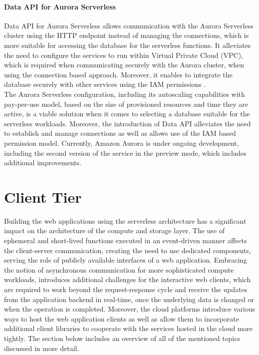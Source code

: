 \paragraph{Data API for Aurora Serverless}

Data API for Aurora Serverless allows communication with the Aurora Serverless cluster using the HTTP endpoint instead of managing the connections, which is more suitable for accessing the database for the serverless functions.
It alleviates the need to configure the services to run within Virtual Private Cloud (VPC), which is required when communicating securely with the Aurora cluster, when using the connection based approach.
Moreover, it enables to integrate the database securely with other services using the IAM permissions \cite{AuroraServerlessDataAPI}. \\

The Aurora Serverless configuration, including its autoscaling capabilities with pay-per-use model, based on the size of provisioned resources and time they are active, is a viable solution when it comes to selecting a database suitable for the serverless workloads.
Moreover, the introduction of Data API alleviates the need to establish and manage connections as well as allows use of the IAM based permission model.
Currently, Amazon Aurora is under ongoing development, including the second version of the service in the preview mode, which includes additional improvements.

\section{Client Tier}

Building the web applications using the serverless architecture has a significant impact on the architecture of the compute and storage layer.
The use of ephemeral and short-lived functions executed in an event-driven manner affects the client-server communication, creating the need to use dedicated components, serving the role of publicly available interfaces of a web application.
Embracing the notion of asynchronous communication for more sophisticated compute workloads, introduces additional challenges for the interactive web clients, which are required to work beyond the request-response cycle and receive the updates from the application backend in real-time, once the underlying data is changed or when the operation is completed.
Moreover, the cloud platforms introduce various ways to host the web application clients as well as allow them to incorporate additional client libraries to cooperate with the services hosted in the cloud more tightly.
The section below includes an overview of all of the mentioned topics discussed in more detail.

